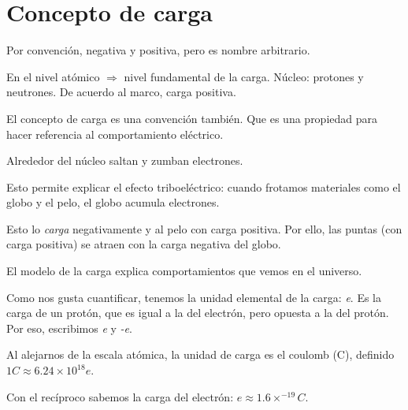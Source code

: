\section{Concepto de carga}

Por convención, negativa y positiva, pero es nombre arbitrario.

En el nivel atómico \(\Rightarrow\) nivel fundamental de la carga.
Núcleo: protones y neutrones. De acuerdo al marco, carga positiva.

El concepto de carga es una convención también.
Que es una propiedad para hacer referencia al comportamiento eléctrico.

Alrededor del núcleo saltan y zumban electrones.

Esto permite explicar el efecto triboeléctrico:
cuando frotamos materiales como el globo y el pelo,
el globo acumula electrones.

Esto lo \textit{carga} negativamente y al pelo con carga positiva.
Por ello, las puntas (con carga positiva) se atraen con la carga negativa del globo.

El modelo de la carga explica comportamientos que vemos en el universo.

Como nos gusta cuantificar, tenemos la unidad elemental de la carga: \textit{e}.
Es la carga de un protón, que es igual a la del electrón, pero opuesta a la del protón.
Por eso, escribimos \textit{e} y \textit{-e}.

Al alejarnos de la escala atómica, la unidad de carga es el coulomb (C),
definido \(1 C \approx 6.24 \times 10^{18} e\).

Con el recíproco sabemos la carga del electrón: \(e \approx 1.6 \times^{-19} C\).